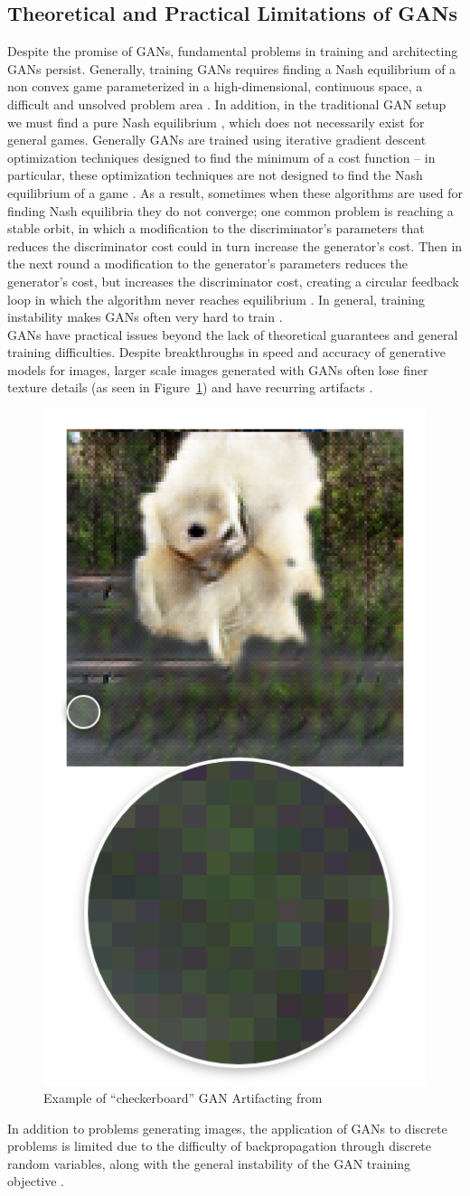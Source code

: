 \documentclass{article}
\begin{document}
\subsection{Theoretical and Practical Limitations of GANs}
Despite the promise of GANs, fundamental problems in training and architecting GANs persist. Generally, training GANs requires finding a Nash equilibrium of a non convex game parameterized in a high-dimensional, continuous space, a difficult and unsolved problem area \citep{Salimans2016}. In addition, in the traditional GAN setup we must find a pure Nash equilibrium \citep{Arora17}, which does not necessarily exist for general games. Generally GANs are trained using iterative gradient descent optimization techniques designed to find the minimum of a cost function – in particular, these optimization techniques are not designed to find the Nash equilibrium of a game \citep{Salimans2016}. As a result, sometimes when these algorithms are used for finding Nash equilibria they do not converge; one common problem is reaching a stable orbit, in which a modification to the discriminator's parameters that reduces the discriminator cost could in turn increase the generator’s cost. Then in the next round a modification to the generator’s parameters reduces the generator’s cost, but increases the discriminator cost, creating a circular feedback loop in which the algorithm never reaches equilibrium \citep{Salimans2016}. In general, training instability makes GANs often very hard to train \citep{DBLP:journals/corr/GulrajaniAADC17}.
\\
GANs have practical issues beyond the lack of theoretical guarantees and general training difficulties. Despite breakthroughs in speed and accuracy of generative models for images, larger scale images generated with GANs often lose finer texture details (as seen in Figure~\ref{artifacting}) and have recurring artifacts \citep{DBLP:journals/corr/LedigTHCATTWS16} \citep{Salimans2016} \citep{DBLP:journals/corr/ShrivastavaPTSW16}.
\begin{figure}[H]
\centering
\includegraphics[width=.25\linewidth]{figures/artifacting_example.png}
\caption{Example of ``checkerboard'' GAN Artifacting from \citet{Salimans2016}}
\label{artifacting}
\end{figure}
In addition to problems generating images, the application of GANs to discrete problems is limited due to the difficulty of backpropagation through discrete random variables, along with the general instability of the GAN training objective \citep{Che+al-2017-augmented}. 
\end{document}
